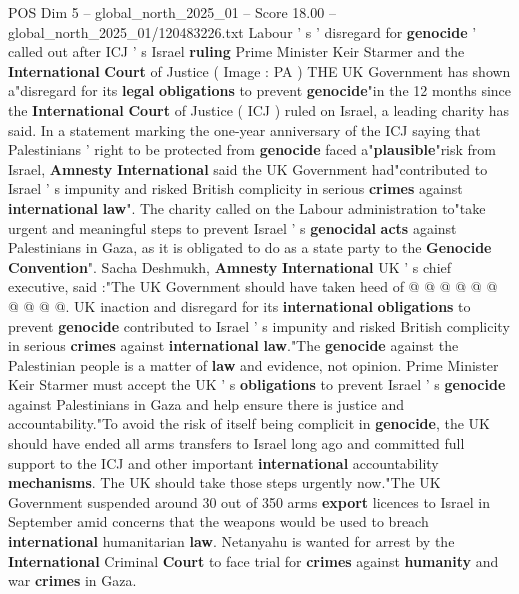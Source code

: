 \begin{textsample}{POS Dim 5 – global\_north\_2025\_01 – Score 18.00 – global\_north\_2025\_01/120483226.txt}  \label{ex:f5_pos_382}
Labour ' s ' disregard for \textbf{genocide} ' called out after ICJ ' s Israel \textbf{ruling} Prime Minister Keir Starmer and the \textbf{International} \textbf{Court} of Justice ( Image : PA ) THE UK Government has shown a"disregard for its \textbf{legal} \textbf{obligations} to prevent \textbf{genocide}"in the 12 months since the \textbf{International} \textbf{Court} of Justice ( ICJ ) ruled on Israel, a leading charity has said.
In a statement marking the one-year anniversary of the ICJ saying that Palestinians ' right to be protected from \textbf{genocide} faced a"\textbf{plausible}"risk from Israel, \textbf{Amnesty} \textbf{International} said the UK Government had"contributed to Israel ' s impunity and risked British complicity in serious \textbf{crimes} against \textbf{international} \textbf{law}".
The charity called on the Labour administration to"take urgent and meaningful steps to prevent Israel ' s \textbf{genocidal} \textbf{acts} against Palestinians in Gaza, as it is obligated to do as a state party to the \textbf{Genocide} \textbf{Convention}".
Sacha Deshmukh, \textbf{Amnesty} \textbf{International} UK ' s chief executive, said :"The UK Government should have taken heed of @ @ @ @ @ @ @ @ @ @.
UK inaction and disregard for its \textbf{international} \textbf{obligations} to prevent \textbf{genocide} contributed to Israel ' s impunity and risked British complicity in serious \textbf{crimes} against \textbf{international} \textbf{law}."The \textbf{genocide} against the Palestinian people is a matter of \textbf{law} and evidence, not opinion.
Prime Minister Keir Starmer must accept the UK ' s \textbf{obligations} to prevent Israel ' s \textbf{genocide} against Palestinians in Gaza and help ensure there is justice and accountability."To avoid the risk of itself being complicit in \textbf{genocide}, the UK should have ended all arms transfers to Israel long ago and committed full support to the ICJ and other important \textbf{international} accountability \textbf{mechanisms}.
The UK should take those steps urgently now."The UK Government suspended around 30 out of 350 arms \textbf{export} licences to Israel in September amid concerns that the weapons would be used to breach \textbf{international} humanitarian \textbf{law}.
Netanyahu is wanted for arrest by the \textbf{International} Criminal \textbf{Court} to face trial for \textbf{crimes} against \textbf{humanity} and war \textbf{crimes} in Gaza.

\end{textsample}
